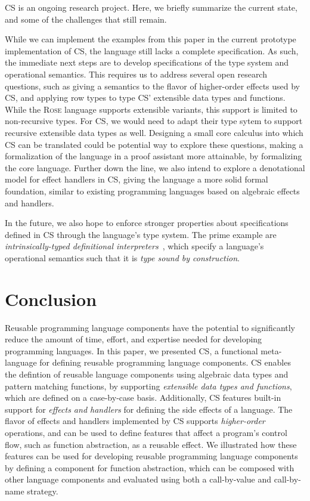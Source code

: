 \documentclass[runningheads]{llncs}
\newcommand{\strachey}{\textsc{CS}}
\begin{document}
\strachey{} is an ongoing research project. Here, we briefly summarize the
current state, and some of the challenges that still remain.

While we can implement the examples from this paper in the current prototype
implementation of \strachey{}, the language still lacks a complete
specification.  As such, the immediate next steps are to develop specifications
of the type system and operational semantics. This requires us to address
several open research questions, such as giving a semantics to the flavor of
higher-order effects used by \strachey{}, and applying row types to type
\strachey{}' extensible data types and functions. While the \textsc{Rose}
language supports extensible variants, this support is limited to non-recursive
types. For \strachey{}, we would need to adapt their type sytem to support
recursive extensible data types as well.  Designing a small core calculus into
which \strachey{} can be translated could be potential way to explore these
questions, making a formalization of the language in a proof assistant more
attainable, by formalizing the core language. Further down the line, we also
intend to explore a denotational model for effect handlers in \strachey{},
giving the language a more solid formal foundation, similar to existing
programming languages based on algebraic effects and handlers.

In the future, we also hope to enforce stronger properties about specifications
defined in \strachey{} through the language's type system. The prime example are
\emph{intrinsically-typed definitional
  interpreters}~\cite{augustsson1999exercise}, which specify a language's
operational semantics such that it is \emph{type sound by construction}.

\section{Conclusion}

Reusable programming language components have the potential to significantly
reduce the amount of time, effort, and expertise needed for developing
programming languages. In this paper, we presented \strachey{}, a functional
meta-language for defining reusable programming language components. \strachey{}
enables the defintion of reusable language components using algebraic data types
and pattern matching functions, by supporting \emph{extensible data types and
  functions}, which are defined on a case-by-case basis. Additionally,
\strachey{} features built-in support for \emph{effects and handlers} for
defining the side effects of a language. The flavor of effects and handlers
implemented by \strachey{} supports \emph{higher-order} operations, and can be
used to define features that affect a program's control flow, such as function
abstraction, as a reusable effect. We illustrated how these features can be used
for developing reusable programming language components by defining a component
for function abstraction, which can be composed with other language components
and evaluated using both a call-by-value and call-by-name strategy.
\end{document}
